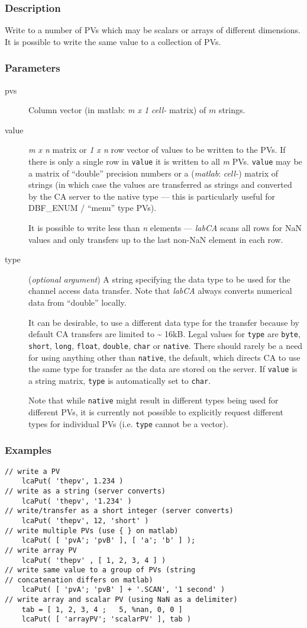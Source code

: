\documentclass{article}
\newcommand{\sca}{\ita{labCA}}
\newcommand{\matlab}{\ita{matlab}}
\newcommand{\com}[1]{{\tt #1}}
\newcommand{\NAN}{\mbox{NaN}}
\newcommand{\ita}[1]{\emph{#1}}
\newcommand{\m}{$m$}
\newcommand{\mhack}{$m$} %
\newcommand{\n}{$n$}
\newcommand{\mxn}{$m\times n$}
\newcommand{\mxl}{$m\times 1$}
\newcommand{\lxn}{$1\times n$}
\newcommand{\calimit}{$\approx 16$kB}
\renewcommand{\m}{\ita{m}}
\newcommand{\mhack}{\ita{m}} %
\renewcommand{\n}{\ita{n}}
\renewcommand{\mxn}{\ita{m x n}}
\renewcommand{\mxl}{\ita{m x 1}}
\renewcommand{\lxn}{\ita{1 x n}}
\renewcommand{\calimit}{\~{} 16kB}
\newcommand{\PVITEM}{
\item[pvs] Column vector (in matlab: \mxl{} \ita{cell-} matrix)
of \mhack{} strings.
}
\begin{document}
\subsubsection{Description}
Write to a number of PVs which may be scalars or arrays of different
dimensions. It is possible to write the same value to a collection of PVs.
\subsubsection{Parameters}
\begin{description}
\PVITEM
%
%
\item[value] \mxn{} matrix or \lxn{} row vector of values
to be written to the PVs. If there is only a single row in \com{value}{}
it is written to all \m{} PVs. \com{value} may be a matrix of ``double''
precision numbers or  a (\matlab: \ita{cell-}) matrix of strings (in
which case the values are transferred as strings and converted by the
CA server to the native type --- this is particularly useful for
DBF\_ENUM / ``menu'' type PVs).

It is possible to write less than \n{} elements --- \sca{} scans all rows
for \NAN{} values and only transfers up to the last non-\NAN{} element in each
row.
%
%
\item[type] (\ita{optional argument}) A string specifying the
data type to be used for the channel access data transfer. Note
that \sca{} always converts numerical data from ``double'' locally.

It can be desirable, to use a different data type for the
transfer because by default CA transfers are limited to \calimit.
Legal values for \com{type}{} are \com{byte}, \com{short}, \com{long},
\com{float}, \com{double}, \com{char} or \com{native}. There should rarely
be a need for using anything other than \com{native}, the default,
which directs CA to use the same type for transfer as the data are
stored on the server. If \com{value} is a string matrix, \com{type}
is automatically set to \com{char}.

Note that while \com{native}{} might result in different types
being used for different PVs, it is currently not possible to
explicitly request different types for individual PVs (i.e. 
\com{type}{} cannot be a vector).
%
\end{description}

\subsubsection{Examples}
\begin{verbatim}
// write a PV
    lcaPut( 'thepv', 1.234 )
// write as a string (server converts)
    lcaPut( 'thepv', '1.234' )
// write/transfer as a short integer (server converts)
    lcaPut( 'thepv', 12, 'short' )
// write multiple PVs (use { } on matlab)
    lcaPut( [ 'pvA'; 'pvB' ], [ 'a'; 'b' ] );
// write array PV
    lcaPut( 'thepv' , [ 1, 2, 3, 4 ] )
// write same value to a group of PVs (string
// concatenation differs on matlab)
    lcaPut( [ 'pvA'; 'pvB' ] + '.SCAN', '1 second' )
// write array and scalar PV (using NaN as a delimiter)
    tab = [ 1, 2, 3, 4 ;   5, %nan, 0, 0 ]
	lcaPut( [ 'arrayPV'; 'scalarPV' ], tab )
\end{verbatim}
\end{document}
